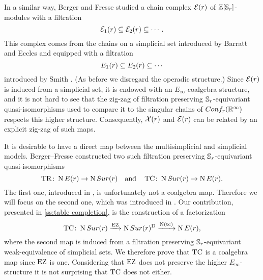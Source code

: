 In a similar way, Berger and Fresse \cite{berger2004combinatorial} studied a chain complex $\mathcal{E}(r)$ of $\mathbb{Z}[\mathbb{S}_r]$-modules with a filtration
\[
\mathcal{E}_{1}(r) \subseteq \mathcal{E}_{2}(r) \subseteq \dotsb \,.
\]
This complex comes from the chains on a simplicial set introduced by Barratt and Eccles \cite{barrat1974operad} and equipped with a filtration
\[
E_{1}(r) \subseteq E_{2}(r) \subseteq \dotsb
\]
introduced by Smith \cite{smith1989filtration}.
(As before we disregard the operadic structure.)
Since $\mathcal{E}(r)$ is induced from a simplicial set, it is endowed with an $E_\infty$-coalgebra structure, and it is not hard to see that the zig-zag of filtration preserving $\mathbb{S}_r$-equivariant quasi-isomorphisms used to compare it to the singular chains of $Conf_{r}(\mathbb{R}^{\infty})$ respects this higher structure.
Consequently, $\mathcal{X}(r)$ and $\mathcal{E}(r)$ can be related by an explicit zig-zag of such maps.

It is desirable to have a direct map between the multisimplicial and simplicial models.
Berger--Fresse constructed two such filtration preserving $\mathbb{S}_r$-equivariant quasi-isomorphisms
\[
\operatorname{TR} \colon \operatorname{N}E(r) \to \operatorname{N}Sur(r)
\quad \text{and} \quad
\operatorname{TC} \colon \operatorname{N}Sur(r) \to \operatorname{N} E(r).
\]
The first one, introduced in \cite[1$\cdot$3]{berger2004combinatorial}, is unfortunately not a coalgebra map.
Therefore we will focus on the second one, which was introduced in \cite{berger2002prismatic}.
Our contribution, presented in \cref{ss:table completion}, is the construction of a factorization
\[
\operatorname{TC} \colon \operatorname{N}Sur(r) \xrightarrow{\operatorname{EZ}} \operatorname{N}Sur(r)^{\mathrm{D}} \xrightarrow{\operatorname{N}(\operatorname{tc})} \operatorname{N} E(r),
\]
where the second map is induced from a filtration preserving $\mathbb{S}_r$-equivariant weak-equivalence of simplicial sets.
We therefore prove that $\operatorname{TC}$ is a coalgebra map since $\operatorname{EZ}$ is one.
Considering that $\operatorname{EZ}$ does not preserve the higher $E_\infty$-structure it is not surprising that $\operatorname{TC}$ does not either.